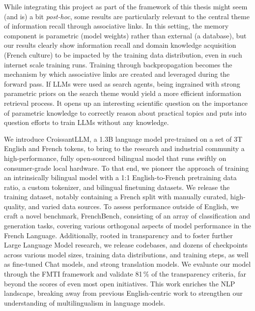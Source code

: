 \begin{sagekaobox}[frametitle=Paper Context]
    While integrating this project as part of the framework of this thesis might seem (and is) a bit \emph{post-hoc}, some results are particularly relevant to the central theme of information recall through associative links. In this setting, the memory component is parametric (model weights) rather than external (a database), but our results clearly show information recall and domain knowledge acquisition (French culture) to be impacted by the training data distribution, even in such internet scale training runs. Training through backpropagation becomes the mechanism by which associative links are created and leveraged during the forward pass. If LLMs were used as search agents, being ingrained with strong parametric priors on the search theme would yield a more efficient information retrieval process. It opens up an interesting scientific question on the importance of parametric knowledge to correctly reason about practical topics and puts into question efforts to train LLMs without any knowledge.
\end{sagekaobox}


\begin{kaobox}[frametitle=Paper Abstract]

We introduce CroissantLLM, a 1.3B language model pre-trained on a set of 3T English and French tokens, to bring to the research and industrial community a high-performance, fully open-sourced bilingual model that runs swiftly on consumer-grade local hardware.
To that end, we pioneer the approach of training an intrinsically bilingual model with a 1:1 English-to-French pretraining data ratio, a custom tokenizer, and bilingual finetuning datasets. We release the training dataset, notably containing a French split with manually curated, high-quality, and varied data sources.
To assess performance outside of English, we craft a novel benchmark, FrenchBench, consisting of an array of classification and generation tasks, covering various orthogonal aspects of model performance in the French Language. Additionally, rooted in transparency and to foster further Large Language Model research, we release codebases, and dozens of checkpoints across various model sizes, training data distributions, and training steps, as well as fine-tuned Chat models, and strong translation models. We evaluate our model through the FMTI framework %
and validate 81\,\% of the transparency criteria, far beyond the scores of even most open initiatives.
This work enriches the NLP landscape, breaking away from previous English-centric work to strengthen our understanding of multilingualism in language models.

\end{kaobox}

